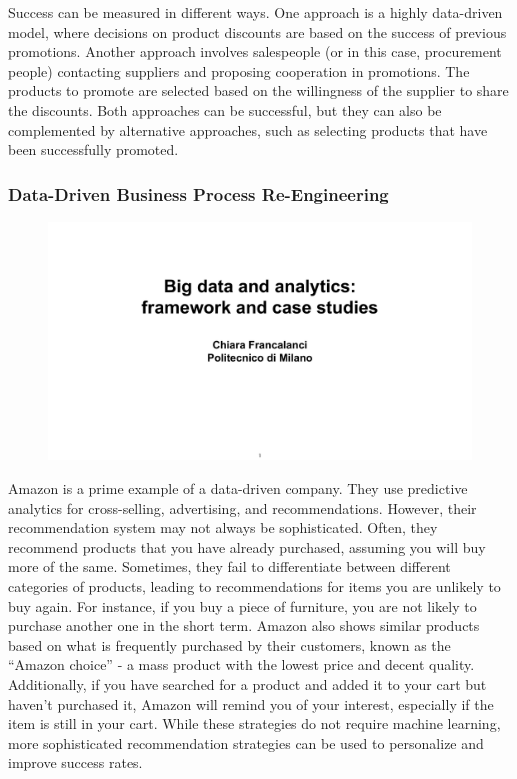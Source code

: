 Success can be measured in different ways. One approach is a highly
data-driven model, where decisions on product discounts are based on the
success of previous promotions. Another approach involves salespeople (or in this case, procurement people)
contacting suppliers and proposing cooperation in promotions. The
products to promote are selected based on the willingness of the
supplier to share the discounts. Both approaches can be successful, but
they can also be complemented by alternative approaches, such as
selecting products that have been successfully promoted.

\subsubsection{Data-Driven Business Process Re-Engineering}

\begin{figure}[!h]
  \centering
  \includegraphics[page=66, trim = 1cm 5cm 1.5cm 3cm, clip, width=\imagewidth]{images/06 - BIG_DATA.pdf}
\end{figure}

Amazon is a prime example of a data-driven company. They use predictive
analytics for cross-selling, advertising, and recommendations. However,
their recommendation system may not always be sophisticated. Often, they
recommend products that you have already purchased, assuming you will
buy more of the same. Sometimes, they fail to differentiate between
different categories of products, leading to recommendations for items
you are unlikely to buy again. For instance, if you buy a piece of
furniture, you are not likely to purchase another one in the short term.
Amazon also shows similar products based on what is frequently purchased
by their customers, known as the ``Amazon choice'' - a mass product with
the lowest price and decent quality. Additionally, if you have searched
for a product and added it to your cart but haven't purchased it, Amazon
will remind you of your interest, especially if the item is still in
your cart. While these strategies do not require machine learning, more
sophisticated recommendation strategies can be used to personalize and
improve success rates.

